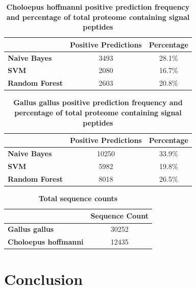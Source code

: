 \documentclass[10pt,letterpaper]{article}
\begin{document}
	\begin{table}[!ht]
		\centering
		\caption{{\bf Choloepus hoffmanni positive prediction frequency and percentage of total proteome containing signal peptides}}
		\label{tab:sloth}
		\begin{tabular}{@{}lcc@{}}
			\toprule
			& \multicolumn{1}{l}{Positive Predictions} & \multicolumn{1}{l}{Percentage} \\ \midrule
			\textbf{Naive Bayes}   & 3493                                     & 28.1\%                         \\
			\textbf{SVM}           & 2080                                     & 16.7\%                         \\
			\textbf{Random Forest} & 2603                                     & 20.8\%                        
		\end{tabular}
	\end{table}
	
	\begin{table}[!ht]
		\centering
		\caption{{\bf Gallus gallus positive prediction frequency and percentage of total proteome containing signal peptides}}
		\label{tab:chicken}
		\begin{tabular}{@{}lcc@{}}
			\toprule
			& \multicolumn{1}{l}{Positive Predictions} & \multicolumn{1}{l}{Percentage} \\ \midrule
			\textbf{Naive Bayes}   & 10250                                    & 33.9\%                         \\
			\textbf{SVM}           & 5982                                     & 19.8\%                         \\
			\textbf{Random Forest} & 8018                                     & 26.5\%                        
		\end{tabular}
	\end{table}
	
	\begin{table}[!ht]
		\centering
		\caption{{\bf Total sequence counts }}
		\label{tab:prot-count}
		\begin{tabular}{@{}lc@{}}
			\toprule
			& \multicolumn{1}{l}{Sequence Count} \\ \midrule
			\textbf{Gallus gallus}       & 30252                              \\
			\textbf{Choloepus hoffmanni} & 12435                             
		\end{tabular}
	\end{table}
	
	\section*{Conclusion}
	
\end{document}
